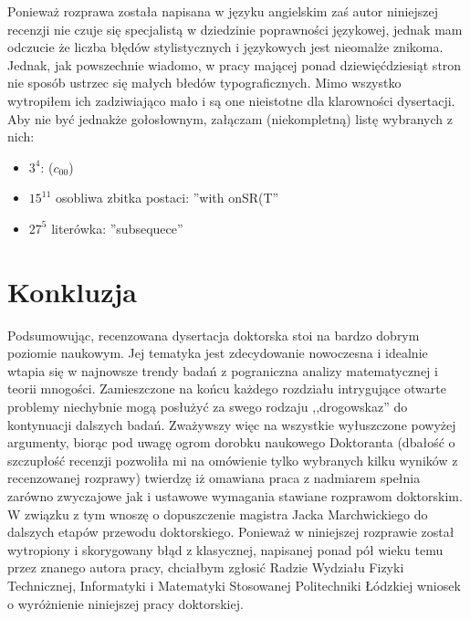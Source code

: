\documentclass[12pt]{article}
\begin{document}
Ponieważ rozprawa została napisana w języku angielskim
zaś autor niniejszej recenzji nie czuje się
specjalistą w dziedzinie poprawności językowej, jednak
mam odczucie że liczba błędów stylistycznych i językowych jest 
nieomalże znikoma. Jednak, jak powszechnie wiadomo, w pracy mającej ponad dziewięćdziesiąt
stron nie sposób ustrzec się małych błedów typograficznych. Mimo
wszystko wytropiłem ich zadziwiająco mało i są one 
nieistotne dla klarowności dysertacji. Aby nie być 
jednakże gołosłownym, załączam (niekompletną) listę wybranych z nich:

\begin{itemize}
\item
  $3^4$: ($c_{00}$)
\item 
  $15^{11}$ osobliwa zbitka postaci: ''with onSR(T''
\item
  $27^5$ literówka: ''subsequece''
\end{itemize}



\section{Konkluzja}
Podsumowując, recenzowana dysertacja doktorska stoi
na bardzo dobrym poziomie naukowym. Jej tematyka jest
zdecydowanie nowoczesna i idealnie wtapia się w najnowsze
trendy badań z pograniczna analizy matematycznej i teorii mnogości.
Zamieszczone na końcu każdego rozdziału intrygujące otwarte problemy
niechybnie mogą posłużyć za swego rodzaju ,,drogowskaz'' 
do kontynuacji dalszych badań.
  Zważywszy więc na wszystkie wyłuszczone powyżej argumenty,
biorąc pod uwagę ogrom dorobku naukowego Doktoranta (dbałość o 
szczupłość recenzji pozwoliła mi na omówienie tylko wybranych
kilku wyników z recenzowanej rozprawy) twierdzę iż omawiana 
praca z nadmiarem spełnia zarówno zwyczajowe jak i ustawowe
wymagania stawiane rozprawom doktorskim. W związku z tym
wnoszę o dopuszczenie magistra Jacka Marchwickiego do dalszych
etapów przewodu doktorskiego.
  Ponieważ w niniejszej rozprawie został wytropiony i 
skorygowany błąd z klasycznej, napisanej ponad pół wieku temu przez znanego
autora pracy, chciałbym zgłosić Radzie Wydziału Fizyki 
Technicznej, Informatyki i Matematyki Stosowanej Politechniki
Łódzkiej wniosek o wyróżnienie niniejszej pracy doktorskiej.
\end{document}

